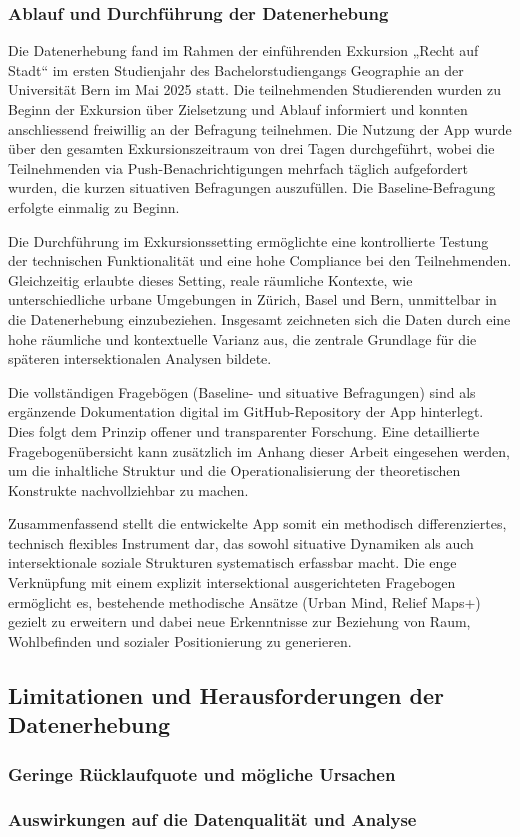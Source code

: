 \subsubsection{Ablauf und Durchführung der Datenerhebung}

Die Datenerhebung fand im Rahmen der einführenden Exkursion „Recht auf Stadt“ im ersten Studienjahr des Bachelorstudiengangs Geographie an der Universität Bern im Mai 2025 statt. Die teilnehmenden Studierenden wurden zu Beginn der Exkursion über Zielsetzung und Ablauf informiert und konnten anschliessend freiwillig an der Befragung teilnehmen. Die Nutzung der App wurde über den gesamten Exkursionszeitraum von drei Tagen durchgeführt, wobei die Teilnehmenden via Push-Benachrichtigungen mehrfach täglich aufgefordert wurden, die kurzen situativen Befragungen auszufüllen. Die Baseline-Befragung erfolgte einmalig zu Beginn.

Die Durchführung im Exkursionssetting ermöglichte eine kontrollierte Testung der technischen Funktionalität und eine hohe Compliance bei den Teilnehmenden. Gleichzeitig erlaubte dieses Setting, reale räumliche Kontexte, wie unterschiedliche urbane Umgebungen in Zürich, Basel und Bern, unmittelbar in die Datenerhebung einzubeziehen. Insgesamt zeichneten sich die Daten durch eine hohe räumliche und kontextuelle Varianz aus, die zentrale Grundlage für die späteren intersektionalen Analysen bildete.

Die vollständigen Fragebögen (Baseline- und situative Befragungen) sind als ergänzende Dokumentation digital im GitHub-Repository der App hinterlegt. Dies folgt dem Prinzip offener und transparenter Forschung. Eine detaillierte Fragebogenübersicht kann zusätzlich im Anhang dieser Arbeit eingesehen werden, um die inhaltliche Struktur und die Operationalisierung der theoretischen Konstrukte nachvollziehbar zu machen.

Zusammenfassend stellt die entwickelte App somit ein methodisch differenziertes, technisch flexibles Instrument dar, das sowohl situative Dynamiken als auch intersektionale soziale Strukturen systematisch erfassbar macht. Die enge Verknüpfung mit einem explizit intersektional ausgerichteten Fragebogen ermöglicht es, bestehende methodische Ansätze (Urban Mind, Relief Maps+) gezielt zu erweitern und dabei neue Erkenntnisse zur Beziehung von Raum, Wohlbefinden und sozialer Positionierung zu generieren.


\subsection{Limitationen und Herausforderungen der Datenerhebung}

\subsubsection{Geringe Rücklaufquote und mögliche Ursachen}

\subsubsection{Auswirkungen auf die Datenqualität und Analyse}
